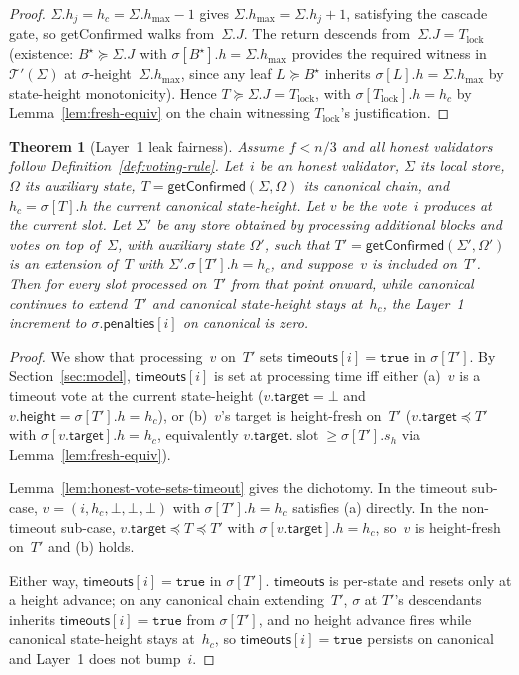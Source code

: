 \documentclass{article}
\newcommand{\slot}[0]{\ensuremath{\operatorname{\mathrm{slot}}}}
\newcommand{\target}{\mathsf{target}}
\newcommand{\height}{\mathsf{height}}
\newcommand{\timeouts}{\mathsf{timeouts}}
\newcommand{\penalties}{\mathsf{penalties}}
\newcommand{\hmax}{\ensuremath{h_{\max}}\xspace}
\newcommand{\viableTree}{\ensuremath{\mathcal{T}'}}
\newcommand{\getConfirmed}{\textsf{getConfirmed}\xspace}
\theoremstyle{plain}
\newtheorem{theorem}{Theorem}
\theoremstyle{definition}
\theoremstyle{remark}
\begin{document}
\begin{proof}
$\Sigma.h_j = h_c = \Sigma.\hmax - 1$ gives $\Sigma.\hmax = \Sigma.h_j + 1$, satisfying the cascade gate, so \getConfirmed{} walks from~$\Sigma.J$.
The return descends from~$\Sigma.J = T_{\mathrm{lock}}$ (existence: $B^\star \succeq \Sigma.J$ with $\sigma[B^\star].h = \Sigma.\hmax$ provides the required witness in $\viableTree(\Sigma)$ at $\sigma$-height~$\Sigma.\hmax$, since any leaf $L \succeq B^\star$ inherits $\sigma[L].h = \Sigma.\hmax$ by state-height monotonicity).
Hence $T \succeq \Sigma.J = T_{\mathrm{lock}}$, with $\sigma[T_{\mathrm{lock}}].h = h_c$ by Lemma~\ref{lem:fresh-equiv} on the chain witnessing $T_{\mathrm{lock}}$'s justification.
\end{proof}

\begin{theorem}[Layer~1 leak fairness]\label{thm:fairness}
Assume $f < n/3$ and all honest validators follow Definition~\ref{def:voting-rule}.
Let~$i$ be an honest validator, $\Sigma$ its local store, $\Omega$ its auxiliary state, $T = \getConfirmed(\Sigma, \Omega)$ its canonical chain, and $h_c = \sigma[T].h$ the current canonical state-height.
Let $v$ be the vote~$i$ produces at the current slot.
Let $\Sigma'$ be any store obtained by processing additional blocks and votes on top of~$\Sigma$, with auxiliary state $\Omega'$, such that $T' = \getConfirmed(\Sigma', \Omega')$ is an extension of~$T$ with $\Sigma'.\sigma[T'].h = h_c$, and suppose~$v$ is included on~$T'$.
Then for every slot processed on~$T'$ from that point onward, while canonical continues to extend~$T'$ and canonical state-height stays at~$h_c$, the Layer~1 increment to $\sigma.\penalties[i]$ on canonical is zero.
\end{theorem}

\begin{proof}
We show that processing~$v$ on~$T'$ sets $\timeouts[i] = \mathtt{true}$ in $\sigma[T']$.
By Section~\ref{sec:model}, $\timeouts[i]$ is set at processing time iff either (a)~$v$ is a timeout vote at the current state-height ($v.\target = \bot$ and $v.\height = \sigma[T'].h = h_c$), or (b)~$v$'s target is height-fresh on~$T'$ ($v.\target \preceq T'$ with $\sigma[v.\target].h = h_c$, equivalently $v.\target.\slot \geq \sigma[T'].s_h$ via Lemma~\ref{lem:fresh-equiv}).

Lemma~\ref{lem:honest-vote-sets-timeout} gives the dichotomy.
In the timeout sub-case, $v = (i, h_c, \bot, \bot, \bot)$ with $\sigma[T'].h = h_c$ satisfies (a) directly.
In the non-timeout sub-case, $v.\target \preceq T \preceq T'$ with $\sigma[v.\target].h = h_c$, so~$v$ is height-fresh on~$T'$ and (b) holds.

Either way, $\timeouts[i] = \mathtt{true}$ in $\sigma[T']$.
$\timeouts$ is per-state and resets only at a height advance; on any canonical chain extending~$T'$, $\sigma$ at $T'$'s descendants inherits $\timeouts[i] = \mathtt{true}$ from $\sigma[T']$, and no height advance fires while canonical state-height stays at~$h_c$, so $\timeouts[i] = \mathtt{true}$ persists on canonical and Layer~1 does not bump~$i$.
\end{proof}
\end{document}
